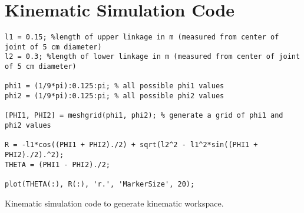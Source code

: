 \chapter{Kinematic Simulation Code}
\label{app:Kinematic Simulation Code}

\begin{listing}[ht]
\begin{verbatim}
l1 = 0.15; %length of upper linkage in m (measured from center of joint of 5 cm diameter)
l2 = 0.3; %length of lower linkage in m (measured from center of joint of 5 cm diameter)

phi1 = (1/9*pi):0.125:pi; % all possible phi1 values
phi2 = (1/9*pi):0.125:pi; % all possible phi2 values

[PHI1, PHI2] = meshgrid(phi1, phi2); % generate a grid of phi1 and phi2 values

R = -l1*cos((PHI1 + PHI2)./2) + sqrt(l2^2 - l1^2*sin((PHI1 + PHI2)./2).^2);
THETA = (PHI1 - PHI2)./2;

plot(THETA(:), R(:), 'r.', 'MarkerSize', 20);
\end{verbatim}
\caption{Kinematic simulation code to generate kinematic workspace.}
\label{listing:Kinematic simulation code}
\end{listing}